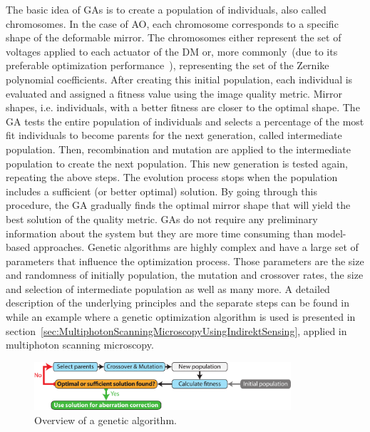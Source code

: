 The basic idea of GAs is to create a population of individuals, also called chromosomes. In the case of AO, each chromosome corresponds to a specific shape of the deformable mirror. The chromosomes either represent the set of voltages applied to each actuator of the DM or, more commonly~(due to its preferable optimization performance~\cite{Genetic_smart_algorithm}), representing the set of the Zernike polynomial coefficients. After creating this initial population, each individual is evaluated and assigned a fitness value using the image quality metric. Mirror shapes, i.e. individuals, with a better fitness are closer to the optimal shape. The GA tests the entire population of individuals and selects a percentage of the most fit individuals to become parents for the next generation, called intermediate population. Then, recombination and mutation are applied to the intermediate population to create the next population. This new generation is tested again, repeating the above steps. The evolution process stops when the population includes a sufficient (or better optimal) solution. By going through this procedure, the GA gradually finds the optimal mirror shape that will yield the best solution of the quality metric. GAs do not require any preliminary information about the system but they are more time consuming than model-based approaches. Genetic algorithms are highly complex and have a large set of parameters that influence the optimization process. Those parameters are the size and randomness of initially population, the mutation and crossover rates, the size and selection of intermediate population as well as many more. A detailed description of the underlying principles and the separate steps can be found in~\cite{Genetic_tutorial} while an example where a genetic optimization algorithm is used is presented in section~\ref{sec:MultiphotonScanningMicroscopyUsingIndirektSensing}, applied in multiphoton scanning microscopy.

\begin{figure}[htbp]
	\centering
		\includegraphics[width=0.85\textwidth]{images/genetic_algorithm_overview.pdf}
	\caption{Overview of a genetic algorithm. }
	\label{fig:genetic_algorithm_overview}
\end{figure}


